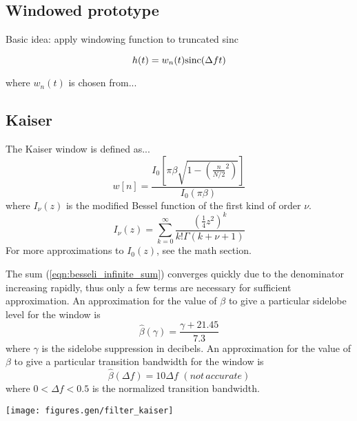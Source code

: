 \subsection{Windowed prototype}
\label{ch:filterdesign:window}

Basic idea: apply windowing function to truncated sinc

\begin{equation}
h(t) = w_n(t) \textup{sinc}(\Delta f t)
\end{equation}

where $w_n(t)$ is chosen from...

\subsection{Kaiser}
\label{ch:filterdesign:window:kaiser}
The Kaiser window is defined as...
\begin{equation}
\label{eqn:kaiser_window}
w[n] = \frac{I_0\left[\pi\beta\sqrt{1-\left(\frac{n}{N/2}^2\right)}\right]}{I_0\left(\pi\beta\right)}
\end{equation}
where $I_\nu(z)$ is the modified Bessel function of the first kind of order $\nu$.
\begin{equation}
\label{eqn:besseli_infinite_sum}
I_\nu(z) = \sum_{k=0}^{\infty}{\frac{\left(\frac{1}{4}z^2\right)^k}{k!\Gamma(k+\nu+1)}}
\end{equation}
For more approximations to $I_0(z)$, see the math section.

The sum (\ref{eqn:besseli_infinite_sum}) converges quickly due to the
denominator increasing rapidly, thus only a few terms are necessary for
sufficient approximation.
An approximation for the value of $\beta$ to give a particular sidelobe level
for the window is
\begin{equation}
\hat{\beta}(\gamma) = \frac{\gamma + 21.45}{7.3}
\end{equation}
where $\gamma$ is the sidelobe suppression in decibels.
An approximation for the value of $\beta$ to give a particular transition
bandwidth for the window is
\begin{equation}
\hat{\beta}(\Delta f) = 10\Delta f \,\, (not\, accurate)
\end{equation}
where $0 < \Delta f < 0.5$ is the normalized transition bandwidth.


\texttt{[image: figures.gen/filter\_kaiser]}


